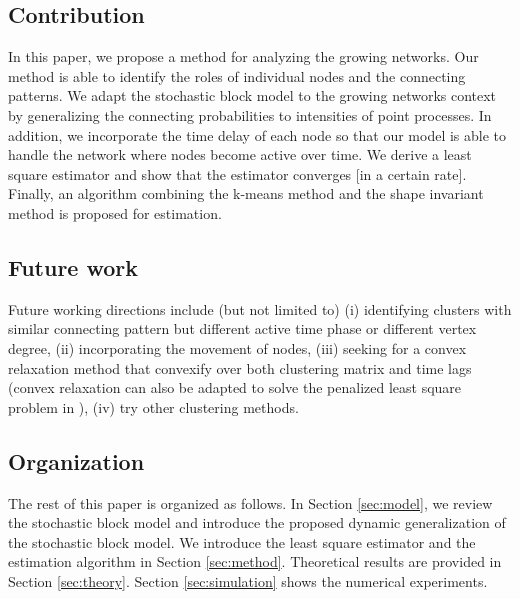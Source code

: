 \subsection*{Contribution}
	In this paper, we propose a method for analyzing the growing networks. Our method is able to identify the roles of individual nodes and the connecting patterns.
	We adapt the stochastic block model to the growing networks context by generalizing the connecting probabilities to intensities of point processes. 
	In addition, we incorporate the time delay of each node so that our model is able to handle the network where nodes become active over time.
	We derive a least square estimator and show that the estimator converges [in a certain rate].
	Finally, an algorithm combining the k-means method and the shape invariant method is proposed for estimation.



\subsection*{Future work}
Future working directions include (but not limited to)
	(i) identifying clusters with similar connecting pattern but different active time phase or different vertex degree,
	(ii) incorporating the movement of nodes,
	(iii) seeking for a convex relaxation method that convexify over both clustering matrix and time lags
	(convex relaxation can also be adapted to solve the penalized least square problem in \citet{Pensky2019a}),
	(iv) try other clustering methods.





\subsection*{Organization}
The rest of this paper is organized as follows. 
In Section \ref{sec:model}, we review the stochastic block model and introduce the proposed dynamic generalization of the stochastic block model.
We introduce the least square estimator and the estimation algorithm in Section \ref{sec:method}.
Theoretical results are provided in Section \ref{sec:theory}. Section \ref{sec:simulation} shows the numerical experiments.



